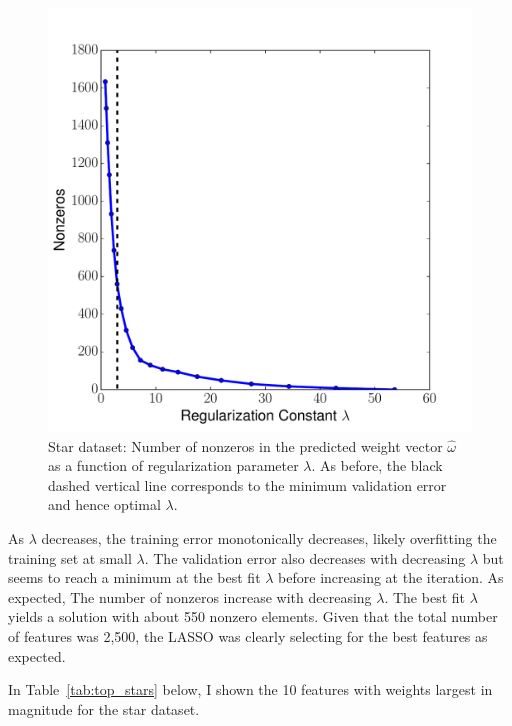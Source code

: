 \documentclass[12pt]{amsart}
\begin{document}
\begin{figure}[H]
	\includegraphics[width=\columnwidth]{star_nonzeros.pdf}
    \caption{Star dataset: Number of nonzeros in the predicted weight vector $\hat{\omega}$ as a function of regularization parameter $\lambda$.  As before, the black dashed vertical line corresponds to the minimum validation error and hence optimal $\lambda$.}
    \label{fig:yelp_star_nonzeros}
\end{figure}

As $\lambda$ decreases, the training error monotonically decreases, likely overfitting the training set at small $\lambda$.  The validation error also decreases with decreasing $\lambda$ but seems to reach a minimum at the best fit $\lambda$ before increasing at the iteration.  As expected, The number of nonzeros increase with decreasing $\lambda$.  The best fit $\lambda$ yields a solution with about 550 nonzero elements.  Given that the total number of features was 2,500, the LASSO was clearly selecting for the best features as expected.

In Table~\ref{tab:top_stars} below, I shown the 10 features with weights largest in magnitude for the star dataset.
\end{document}

